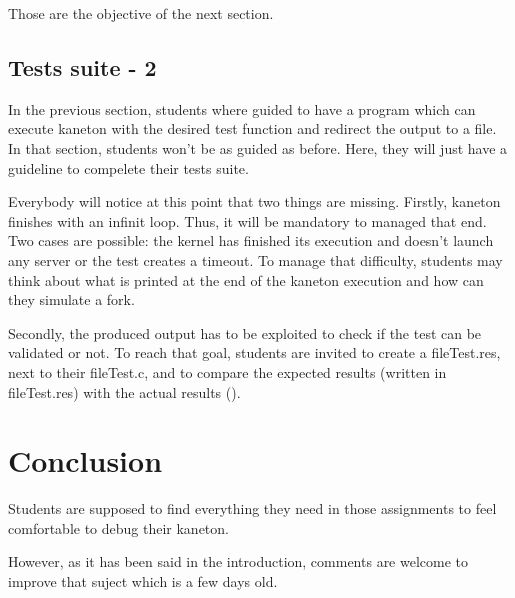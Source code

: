 Those are the objective of the next section.

\section{Tests suite - 2}
In the previous section, students where guided to have a program which can execute kaneton with the desired test function and redirect the output to a file. In that section, students won't be as guided as before. Here, they will just have a guideline to compelete their tests suite.


Everybody will notice at this point that two things are missing. Firstly, kaneton finishes with an infinit loop. Thus, it will be mandatory to managed that end. Two cases are possible: the kernel has finished its execution and doesn't launch any server or the test creates a timeout. To manage that difficulty, students may think about what is printed at the end of the kaneton execution and how can they simulate a fork.

Secondly, the produced output has to be exploited to check if the test can be validated or not. To reach that goal, students are invited to create a fileTest.res, next to their fileTest.c, and to compare the expected results (written in fileTest.res) with the actual results ().

\chapter{Conclusion}
Students are supposed to find everything they need in those assignments to feel comfortable to debug their kaneton.

However, as it has been said in the introduction, comments are welcome to improve that suject which is a few days old.




